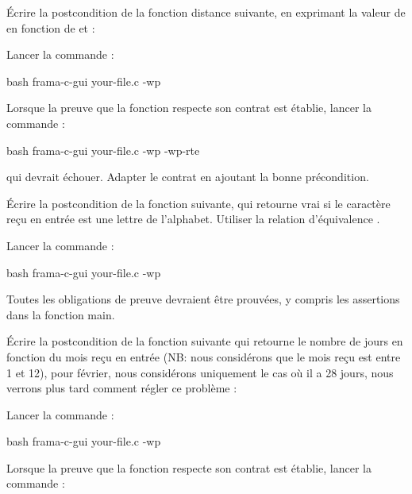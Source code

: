 

Écrire la postcondition de la fonction distance suivante, en exprimant
la valeur de  en fonction de  et
 :




Lancer la commande :


\begin{CodeBlock}{bash}
frama-c-gui your-file.c -wp
\end{CodeBlock}


Lorsque la preuve que la fonction respecte son contrat est établie, lancer
la commande :

\begin{CodeBlock}{bash}
frama-c-gui your-file.c -wp -wp-rte
\end{CodeBlock}


qui devrait échouer. Adapter le contrat en ajoutant la bonne précondition.




Écrire la postcondition de la fonction suivante, qui retourne vrai si le
caractère reçu en entrée est une lettre de l'alphabet. Utiliser la relation
d'équivalence  \CodeInline{<==>}.




Lancer la commande :


\begin{CodeBlock}{bash}
frama-c-gui your-file.c -wp
\end{CodeBlock}


Toutes les obligations de preuve devraient être prouvées, y compris les
assertions dans la fonction main.




Écrire la postcondition de la fonction suivante qui retourne le nombre de
jours en fonction du mois reçu en entrée (NB: nous considérons que le mois
reçu est entre 1 et 12), pour février, nous considérons uniquement le cas
où il a 28 jours, nous verrons plus tard comment régler ce problème :




Lancer la commande :


\begin{CodeBlock}{bash}
frama-c-gui your-file.c -wp
\end{CodeBlock}


Lorsque la preuve que la fonction respecte son contrat est établie, lancer
la commande :

